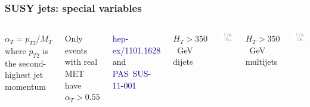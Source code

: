 \documentclass[compress]{beamer}
\begin{document}
\begin{frame}
\frametitle{SUSY jets: special variables}

\vspace{0.4 cm}
\begin{columns}

\vspace{-0.4 cm}
$\alpha_T = p_{T2}/M_T$ where $p_{T2}$ is the second-highest jet momentum

\vspace{0.2 cm}
Only events with real MET have $\alpha_T > 0.55$

\textcolor{darkblue}{\scriptsize hep-ex/1101.1628 \textcolor{black}{and} PAS~SUS-11-001}

\scriptsize \centering $H_T > 350$~GeV dijets

\includegraphics[width=\linewidth]{plots/alphat_dijets.pdf}

\scriptsize \centering $H_T > 350$~GeV multijets

\includegraphics[width=\linewidth]{plots/alphat_multijets.pdf}
\end{columns}


\end{frame}
\end{document}
